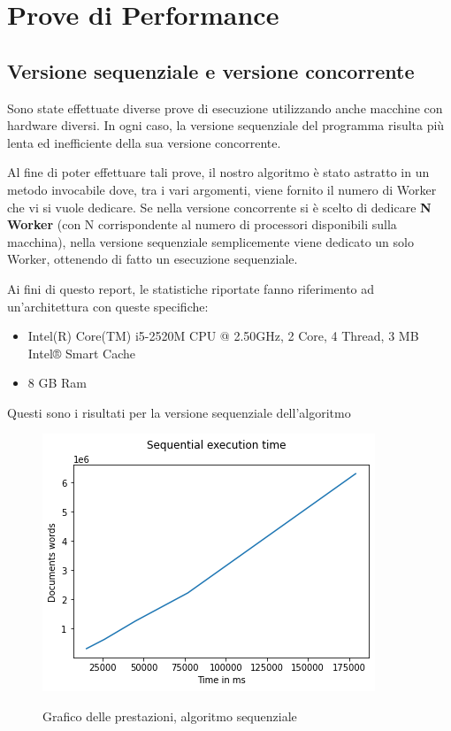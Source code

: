 \chapter{Prove di Performance}
\section{Versione sequenziale e versione concorrente}
Sono state effettuate diverse prove di esecuzione utilizzando anche macchine con hardware diversi. In ogni caso, la versione sequenziale del programma risulta più lenta ed inefficiente della sua versione concorrente.\newline

\noindent Al fine di poter effettuare tali prove, il nostro algoritmo è stato astratto in un metodo invocabile dove, tra i vari argomenti, viene fornito il numero di Worker che vi si vuole dedicare. Se nella versione concorrente si è scelto di dedicare \textbf{N Worker} (con N corrispondente al numero di processori disponibili sulla macchina), nella versione sequenziale semplicemente viene dedicato un solo Worker, ottenendo di fatto un esecuzione sequenziale.

\noindent Ai fini di questo report, le statistiche riportate fanno riferimento ad un'architettura con queste specifiche:
\begin{itemize}
    \item Intel(R) Core(TM) i5-2520M CPU @ 2.50GHz, 2 Core, 4 Thread, 3 MB Intel® Smart Cache
    \item 8 GB Ram
\end{itemize}

\noindent Questi sono i risultati per la versione sequenziale dell'algoritmo
\begin{figure}[H]
	\begin{center}
		\includegraphics[width=0.55\linewidth]{img/sequential-graph.png}
		\label{fig:seq}
		\caption{Grafico delle prestazioni, algoritmo sequenziale}
	\end{center}
\end{figure}

